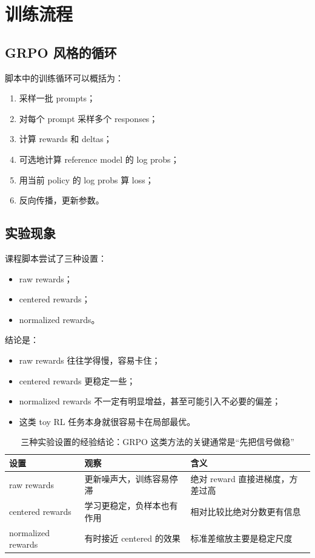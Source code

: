 \documentclass[a4paper]{article}
\begin{document}
\section{训练流程}

\subsection{GRPO 风格的循环}

脚本中的训练循环可以概括为：
\begin{enumerate}
    \item 采样一批 prompts；
    \item 对每个 prompt 采样多个 responses；
    \item 计算 rewards 和 deltas；
    \item 可选地计算 reference model 的 log probs；
\item 用当前 policy 的 log probs 算 loss；
\item 反向传播，更新参数。
\end{enumerate}


\subsection{实验现象}

课程脚本尝试了三种设置：
\begin{itemize}
    \item raw rewards；
    \item centered rewards；
    \item normalized rewards。
\end{itemize}

结论是：
\begin{itemize}
    \item raw rewards 往往学得慢，容易卡住；
    \item centered rewards 更稳定一些；
    \item normalized rewards 不一定有明显增益，甚至可能引入不必要的偏差；
    \item 这类 toy RL 任务本身就很容易卡在局部最优。
\end{itemize}

\begin{table}[H]
\centering
\begin{tabular}{@{}p{3.2cm}p{4.6cm}p{4.8cm}@{}}
\toprule
\textbf{设置} & \textbf{观察} & \textbf{含义} \\
\midrule
raw rewards & 更新噪声大，训练容易停滞 & 绝对 reward 直接进梯度，方差过高 \\
centered rewards & 学习更稳定，负样本也有作用 & 相对比较比绝对分数更有信息 \\
normalized rewards & 有时接近 centered 的效果 & 标准差缩放主要是稳定尺度 \\
\bottomrule
\end{tabular}
\caption{三种实验设置的经验结论：GRPO 这类方法的关键通常是“先把信号做稳”}
\end{table}
\end{document}
